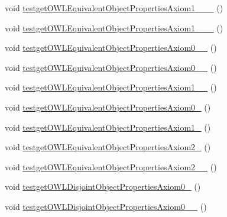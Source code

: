 \begin{DoxyCompactItemize}
\item 
void \hyperlink{classorg_1_1semanticweb_1_1owlapi_1_1api_1_1test_1_1_null_check_test_case_a942c208f18e552ecf01dbafff2875d64}{testget\-O\-W\-L\-Equivalent\-Object\-Properties\-Axiom1\-\_\-\_\-\_} ()
\item 
void \hyperlink{classorg_1_1semanticweb_1_1owlapi_1_1api_1_1test_1_1_null_check_test_case_a93faf476d19254d898047fb300cab628}{testget\-O\-W\-L\-Equivalent\-Object\-Properties\-Axiom1\-\_\-\_\-\_} ()
\item 
void \hyperlink{classorg_1_1semanticweb_1_1owlapi_1_1api_1_1test_1_1_null_check_test_case_a3f4f21fb7f87a2570d581b80f5132f74}{testget\-O\-W\-L\-Equivalent\-Object\-Properties\-Axiom0\-\_\-\_} ()
\item 
void \hyperlink{classorg_1_1semanticweb_1_1owlapi_1_1api_1_1test_1_1_null_check_test_case_ae4c29ddd7c6b91ead09f90e4451d00a9}{testget\-O\-W\-L\-Equivalent\-Object\-Properties\-Axiom0\-\_\-\_} ()
\item 
void \hyperlink{classorg_1_1semanticweb_1_1owlapi_1_1api_1_1test_1_1_null_check_test_case_a2d67a37a936fd49a4586d0d63e759367}{testget\-O\-W\-L\-Equivalent\-Object\-Properties\-Axiom1\-\_\-\_} ()
\item 
void \hyperlink{classorg_1_1semanticweb_1_1owlapi_1_1api_1_1test_1_1_null_check_test_case_a5aa23d808c2f0f3f29ea0d46e40bbde0}{testget\-O\-W\-L\-Equivalent\-Object\-Properties\-Axiom0\-\_} ()
\item 
void \hyperlink{classorg_1_1semanticweb_1_1owlapi_1_1api_1_1test_1_1_null_check_test_case_a1c792d5ed7a1e6e5b8a585c57aa03187}{testget\-O\-W\-L\-Equivalent\-Object\-Properties\-Axiom1\-\_} ()
\item 
void \hyperlink{classorg_1_1semanticweb_1_1owlapi_1_1api_1_1test_1_1_null_check_test_case_a042a3d6a7bfe382c80d8b3427ae39749}{testget\-O\-W\-L\-Equivalent\-Object\-Properties\-Axiom2\-\_} ()
\item 
void \hyperlink{classorg_1_1semanticweb_1_1owlapi_1_1api_1_1test_1_1_null_check_test_case_a0d0e8c1d6a1312f4d0ccd53e5f84847d}{testget\-O\-W\-L\-Equivalent\-Object\-Properties\-Axiom2\-\_\-\_} ()
\item 
void \hyperlink{classorg_1_1semanticweb_1_1owlapi_1_1api_1_1test_1_1_null_check_test_case_a961a9f38a36d417d3350e2012f2590fc}{testget\-O\-W\-L\-Disjoint\-Object\-Properties\-Axiom0\-\_} ()
\item 
void \hyperlink{classorg_1_1semanticweb_1_1owlapi_1_1api_1_1test_1_1_null_check_test_case_a4e470990ae369163c9fde6f83d09e541}{testget\-O\-W\-L\-Disjoint\-Object\-Properties\-Axiom0\-\_\-\_} ()

\end{DoxyCompactItemize}
